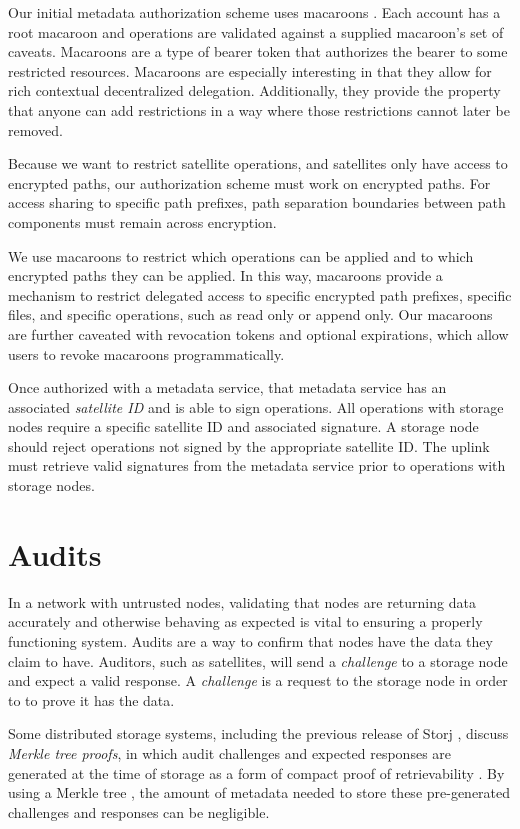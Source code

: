 \documentclass[11pt,fleqn,openany]{book}
\begin{document}
Our initial metadata authorization scheme uses macaroons \cite{macaroons}.
Each account has a root macaroon and operations are validated against a supplied
macaroon's set of caveats. Macaroons are a type of bearer token that authorizes
the bearer to some restricted resources. Macaroons are especially interesting
in that they allow for rich contextual decentralized delegation. Additionally, they
provide the property that anyone can add restrictions in a way where those
restrictions cannot later be removed.

Because we want to restrict satellite operations, and satellites only have access
to encrypted paths, our authorization scheme must work on encrypted paths. For
access sharing to specific path prefixes, path separation boundaries between
path components must remain across encryption.

We use macaroons to restrict which operations can be applied and to which
encrypted paths they can be applied. In this way, macaroons provide a
mechanism to restrict delegated access to specific encrypted path prefixes,
specific files, and specific operations, such as read only or append only.
Our macaroons are further caveated with revocation tokens and optional
expirations, which allow users to revoke macaroons programmatically.

Once authorized with a metadata service, that metadata service has an associated
{\em satellite ID} and is able to sign operations. All
operations with storage nodes require a specific satellite ID and associated
signature. A storage node should reject operations not signed by the appropriate
satellite ID. The uplink must retrieve valid signatures from the metadata
service prior to operations with storage nodes.

\section{Audits}\label{sec:concrete-audits}

In a network with untrusted nodes, validating that nodes are returning data
accurately and otherwise behaving as expected is vital to ensuring a properly
functioning system. Audits are a way to confirm that nodes have the data they
claim to have. Auditors, such as satellites, will send a {\em challenge} to a
storage node and expect a valid response. A {\em challenge} is a request to the
storage node in order to to prove it has the data.

Some distributed storage systems, including the previous release of Storj
\cite{storj-v2}, discuss {\em Merkle tree proofs}, in which audit challenges
and expected responses are generated at the time of storage as a form of compact
proof of retrievability \cite{proof-of-retrievability}. By using a Merkle tree
\cite{merkle-tree}, the amount of metadata needed to store these pre-generated
challenges and responses can be negligible.
\end{document}
